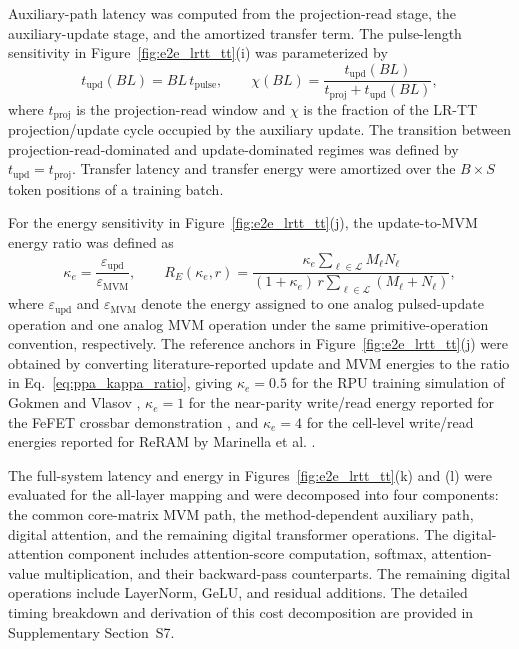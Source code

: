 \documentclass[AMA,LATO2COL]{WileyNJDv5}
\begin{document}
\noindent
Auxiliary-path latency was computed from the projection-read stage, the auxiliary-update stage, and the amortized transfer term. The pulse-length sensitivity in Figure~\ref{fig:e2e_lrtt_tt}(i) was parameterized by
\begin{equation}
t_{\mathrm{upd}}(BL)=BL\,t_{\mathrm{pulse}},
\qquad
\chi(BL)=\frac{t_{\mathrm{upd}}(BL)}
{t_{\mathrm{proj}}+t_{\mathrm{upd}}(BL)},
\label{eq:ppa_bl_latency_fraction}
\end{equation}
where \(t_{\mathrm{proj}}\) is the projection-read window and \(\chi\) is the fraction of the LR-TT projection/update cycle occupied by the auxiliary update. The transition between projection-read-dominated and update-dominated regimes was defined by \(t_{\mathrm{upd}}=t_{\mathrm{proj}}\). Transfer latency and transfer energy were amortized over the \(B\times S\) token positions of a training batch.

\noindent
For the energy sensitivity in Figure~\ref{fig:e2e_lrtt_tt}(j), the update-to-MVM energy ratio was defined as
\begin{equation}
\kappa_e=\frac{\varepsilon_{\mathrm{upd}}}{\varepsilon_{\mathrm{MVM}}},
\qquad
R_E(\kappa_e,r)=
\frac{\kappa_e\sum_{\ell\in\mathcal{L}}M_\ell N_\ell}
{(1+\kappa_e)\,r\sum_{\ell\in\mathcal{L}}(M_\ell+N_\ell)} ,
\label{eq:ppa_kappa_ratio}
\end{equation}
where \(\varepsilon_{\mathrm{upd}}\) and \(\varepsilon_{\mathrm{MVM}}\) denote the energy assigned to one analog pulsed-update operation and one analog MVM operation under the same primitive-operation convention, respectively. The reference anchors in Figure~\ref{fig:e2e_lrtt_tt}(j) were obtained by converting literature-reported update and MVM energies to the ratio in Eq.~\eqref{eq:ppa_kappa_ratio}, giving \(\kappa_e=0.5\) for the RPU training simulation of Gokmen and Vlasov \cite{gokmen2016rpu}, \(\kappa_e=1\) for the near-parity write/read energy reported for the FeFET crossbar demonstration \cite{soliman2023fefet_crossbar}, and \(\kappa_e=4\) for the cell-level write/read energies reported for ReRAM by Marinella et al. \cite{marinella2018rram_training}.

\noindent
The full-system latency and energy in Figures~\ref{fig:e2e_lrtt_tt}(k) and (l) were evaluated for the all-layer mapping and were decomposed into four components: the common core-matrix MVM path, the method-dependent auxiliary path, digital attention, and the remaining digital transformer operations. The digital-attention component includes attention-score computation, softmax, attention-value multiplication, and their backward-pass counterparts. The remaining digital operations include LayerNorm, GeLU, and residual additions. The detailed timing breakdown and derivation of this cost decomposition are provided in Supplementary Section~S7.
\end{document}
